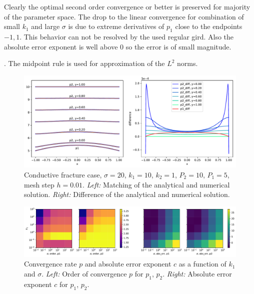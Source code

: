 \documentclass[a4paper,10pt]{article}
\begin{document}
Clearly the optimal second order convergence or better is preserved for majority of the parameter space. The drop to the linear convergence for combination 
of small $k_1$ and large $\sigma$ is due to extreme derivatives of $p_1$ close to the endpoints ${-1, 1}$. This behavior can not be resolved by the used regular gird.
Also the absolute error exponent is well above $0$ so the error is of small magnitude. 



 
. The midpoint
rule is used for approximation of the $L^2$ norms. 
\begin{figure}
  \label{fig:cont_solution}
  \centering
  \includegraphics[width=\textwidth]{./continuous_solution.pdf}
  \caption{Conductive fracture case, $\sigma=20$, $k_1=10$, $k_2=1$, $P_2=10$, $P_1=5$, mesh step $h=0.01$. 
  {\it Left:} Matching of the analytical and numerical solution. 
  {\it Right:} Difference of the analytical and numerical solution.}
\end{figure}

\begin{figure}
  \label{fig:cont_rate}
  \centering
  \includegraphics[width=\textwidth]{./continuous_conv_rate.pdf}
  \caption{Convergence rate $p$ and absolute error exponent $c$ as a function of $k_1$ and $\sigma$. 
  {\it Left:} Order of convergence $p$ for $p_1$, $p_2$.
  {\it Right:} Absolute error exponent $c$ for $p_1$, $p_2$.}
\end{figure}
\end{document}
